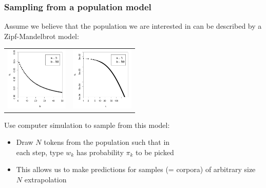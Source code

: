 \documentclass[handout,notes=show,t]{beamer} %
\begin{document}
\begin{frame}
  \frametitle{Sampling from a population model}

  Assume we believe that the population we are interested in can be described
  by a Zipf-Mandelbrot model: %
  \begin{center}
    \begin{tabular}{cc}
      \includegraphics[width=30mm]{img/02-samples-zm-model} &
      \includegraphics[width=30mm]{img/02-samples-zm-model-log} 
    \end{tabular}
  \end{center}
  
  Use computer simulation to sample from this model:
  \begin{itemize}
  \item Draw $N$ tokens from the population such that in\\
    each step, type $w_k$ has probability $\pi_k$ to be picked
  \item This allows us to make predictions for samples (= corpora) of
    arbitrary size $N$ \so extrapolation
  \end{itemize}
\end{frame}
\end{document}
